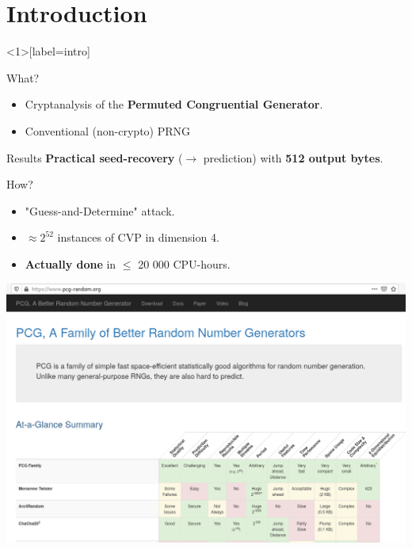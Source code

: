\documentclass[11pt,xcolor={x11names,svgnames}]{beamer}
\begin{document}
\section{Introduction}
\begin{frame}<1>[label=intro]
    
    \begin{exampleblock}{What?}
      \begin{itemize}
        
      \item Cryptanalysis of the \textbf{\alert{P}ermuted \alert{C}ongruential \alert{G}enerator}.
      \item Conventional (non-crypto) PRNG
      \end{itemize}
    \end{exampleblock}
    
    \medskip\pause
    
    \begin{alertblock}{Results}
      \textbf{Practical seed-recovery} ($\rightarrow$ prediction) with \textbf{512 output bytes}.
    \end{alertblock}
    
    \begin{block}{How?}
    \begin{itemize}
        \item "Guess-and-Determine" attack.
        \item $\approx 2^{52}$ instances of CVP in dimension 4.
        \item \textbf{Actually done} in $\leq$ 20 000 CPU-hours.
    \end{itemize}  
    \end{block}
\end{frame}

\begin{frame}[label=why]
  \hspace*{-\beamerleftmargin}%
  \includegraphics[width=\paperwidth]{pictures/website.png}
\end{frame}
\end{document}
